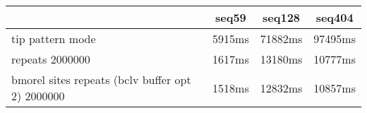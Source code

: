 \begin{tabular}{|l|c|c|c|}
\hline
 & seq59 & seq128 & seq404  \\
\hline
tip pattern mode &  5915ms &  71882ms &  97495ms\\
\hline
repeats 2000000 &  1617ms &  13180ms &  10777ms\\
\hline
bmorel sites repeats (bclv buffer opt 2) 2000000 &  1518ms &  12832ms &  10857ms\\
\hline
\end{tabular}
